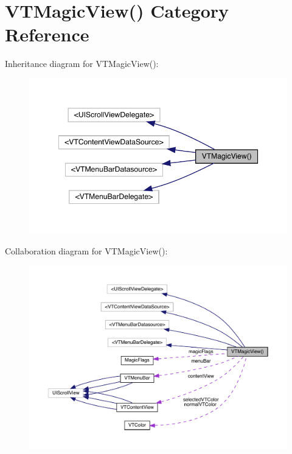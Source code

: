 \hypertarget{category_v_t_magic_view_07_08}{}\section{V\+T\+Magic\+View() Category Reference}
\label{category_v_t_magic_view_07_08}


Inheritance diagram for V\+T\+Magic\+View()\+:\nopagebreak
\begin{figure}[H]
\begin{center}
\leavevmode
\includegraphics[width=349pt]{category_v_t_magic_view_07_08__inherit__graph}
\end{center}
\end{figure}


Collaboration diagram for V\+T\+Magic\+View()\+:\nopagebreak
\begin{figure}[H]
\begin{center}
\leavevmode
\includegraphics[width=350pt]{category_v_t_magic_view_07_08__coll__graph}
\end{center}
\end{figure}
